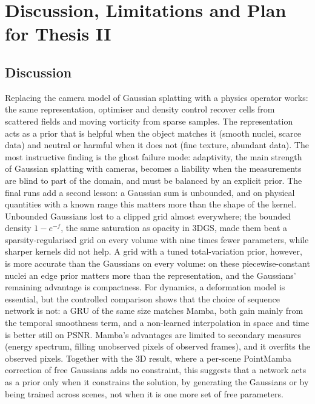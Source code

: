 \chapter{Discussion, Limitations and Plan for Thesis II}
\label{ch:conclusion}

\section{Discussion}
Replacing the camera model of Gaussian splatting with a physics operator works: the same representation, optimiser and
density control recover cells from scattered fields and moving vorticity from sparse samples. The representation acts
as a prior that is helpful when the object matches it (smooth nuclei, scarce data) and neutral or harmful when it does
not (fine texture, abundant data). The most instructive finding is the ghost failure mode: adaptivity, the main
strength of Gaussian splatting with cameras, becomes a liability when the measurements are blind to part of the
domain, and must be balanced by an explicit prior. The final runs add a second lesson: a Gaussian sum is unbounded, and on physical quantities with a known range
this matters more than the shape of the kernel. Unbounded Gaussians lost to a clipped grid almost everywhere;
the bounded density $1-e^{-f}$, the same saturation as opacity in 3DGS, made them beat a sparsity-regularised grid on
every volume with nine times fewer parameters, while sharper kernels did not help. A grid with a tuned total-variation
prior, however, is more accurate than the Gaussians on every volume: on these piecewise-constant nuclei an edge prior
matters more than the representation, and the Gaussians' remaining advantage is compactness. For dynamics, a deformation model is essential, but the controlled comparison shows that
the choice of sequence network is not: a GRU of the same size matches Mamba, both gain mainly from the temporal
smoothness term, and a non-learned interpolation in space and time is better still on PSNR. Mamba's advantages are
limited to secondary measures (energy spectrum, filling unobserved pixels of observed frames), and it overfits the
observed pixels. Together with the 3D result, where a per-scene PointMamba correction of free Gaussians adds no
constraint, this suggests that a network acts as a prior only when it constrains the solution, by generating the
Gaussians or by being trained across scenes, not when it is one more set of free parameters.

